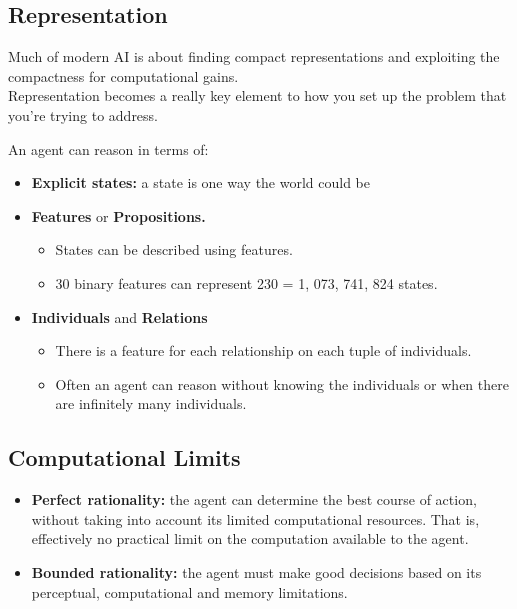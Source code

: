 \documentclass[12pt]{article}
\begin{document}
\subsection{Representation}
Much of modern AI is about finding compact representations and exploiting the compactness for computational gains.\\
\noindent Representation becomes a really key element to how you set up the problem that you're trying to address.

\noindent An agent can reason in terms of:

\begin{itemize}
    \item \textbf{Explicit states:} a state is one way the world could be
    \item \textbf{Features} or \textbf{Propositions.}
    \begin{itemize}
        \item States can be described using features.
        \item 30 binary features can represent 230 = 1, 073, 741, 824 states.
    \end{itemize}
    \item \textbf{Individuals} and \textbf{Relations}
    \begin{itemize}
        \items Are we dealing with an individual agent or are we dealing with relations {couldn't understand the word} between or are we dealing with abstract representations of agents that just comes across like an individual agent.  
        \item There is a feature for each relationship on each tuple of individuals.
        \item Often an agent can reason without knowing the individuals or when there are infinitely many
individuals.
    \end{itemize}
\end{itemize}

\subsection{Computational Limits}

\begin{itemize}
    \item \textbf{Perfect rationality:} the agent can determine the best course of action, without taking
into account its limited computational resources. That is, effectively no practical limit on the computation available to the agent.
    \item \textbf{Bounded rationality:} the agent must make good decisions based on its perceptual,
computational and memory limitations.
\end{itemize}
\end{document}
